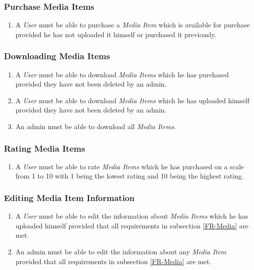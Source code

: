 \documentclass[../report.tex]{subfiles}
\begin{document}
\subsubsection {Purchase Media Items}

\begin{enumerate}[label=\textbf{FR-\twodigits*}, resume]
	\item A \textit{User} must be able to purchase a \textit{Media Item} which is available for purchase provided he has not uploaded it himself or  purchased it previously.
\end{enumerate}

\subsubsection {Downloading Media Items}

\begin{enumerate}[label=\textbf{FR-\twodigits*}, resume]
	\item A \textit{User} must be able to download \textit{Media Items} which he has purchased provided they have not been deleted by an admin.
	\item A \textit{User} must be able to download \textit{Media Items} which he has uploaded himself provided they have not been deleted by an admin.
	\item An admin must be able to download all \textit{Media Items}.
\end{enumerate}
		
\subsubsection {Rating Media Items} \label{FR-RatingMedia}

\begin{enumerate}[label=\textbf{FR-\twodigits*}, resume]
	\item A \textit{User} must be able to rate \textit{Media Items} which he has purchased on a scale from 1 to 10 with 1 being the lowest rating and 10 being the highest rating.
\end{enumerate}

\subsubsection{Editing Media Item Information}

\begin{enumerate}[label=\textbf{FR-\twodigits*}, resume]
	\item A \textit{User} must be able to edit the information about \textit{Media Items} which he has uploaded himself provided that all requirements in subsection \ref{FR-Media} are met.
	\item An admin must be able to edit the information about any \textit{Media Item} provided that all requirements in subsection \ref{FR-Media} are met.
\end{enumerate}
			
\end{document}
